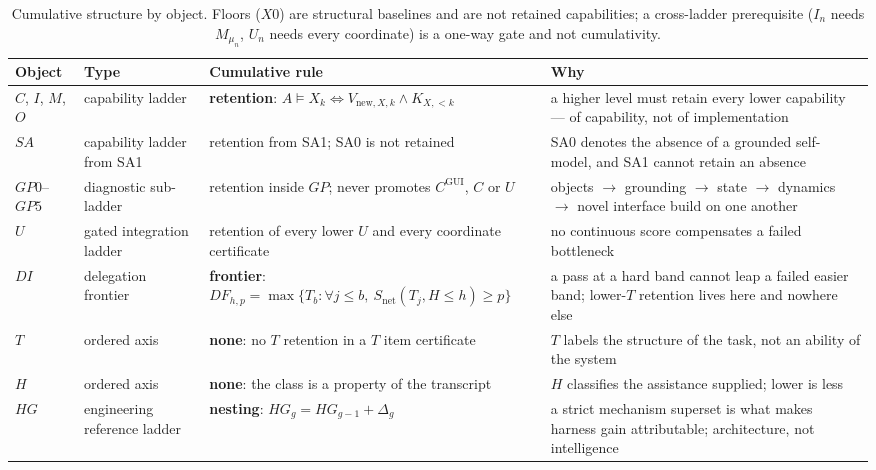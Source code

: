 \begin{table}[!htbp]
\centering\small
\begin{tabularx}{\textwidth}{@{}llYY@{}}
\toprule
Object & Type & Cumulative rule & Why \\
\midrule
$C$, $I$, $M$, $O$ & capability ladder & \textbf{retention}: $A \models X_k \iff V_{\mathrm{new},X,k} \wedge K_{X,<k}$ & a higher level must retain every lower capability --- of capability, not of implementation \\
$SA$ & capability ladder from SA1 & retention from SA1; SA0 is not retained & SA0 denotes the absence of a grounded self-model, and SA1 cannot retain an absence \\
$GP0$--$GP5$ & diagnostic sub-ladder & retention inside $GP$; never promotes $C^{\mathrm{GUI}}$, $C$ or $U$ & objects $\to$ grounding $\to$ state $\to$ dynamics $\to$ novel interface build on one another \\
$U$ & gated integration ladder & retention of every lower $U$ and every coordinate certificate & no continuous score compensates a failed bottleneck \\
$DI$ & delegation frontier & \textbf{frontier}: $DF_{h,p} = \max\{T_b : \forall j \le b,\ S_{\mathrm{net}}(T_j, H \le h) \ge p\}$ & a pass at a hard band cannot leap a failed easier band; lower-$T$ retention lives here and nowhere else \\
$T$ & ordered axis & \textbf{none}: no $T$ retention in a $T$ item certificate & $T$ labels the structure of the task, not an ability of the system \\
$H$ & ordered axis & \textbf{none}: the class is a property of the transcript & $H$ classifies the assistance supplied; lower is less \\
$HG$ & engineering reference ladder & \textbf{nesting}: $HG_g = HG_{g-1} + \Delta_g$ & a strict mechanism superset is what makes harness gain attributable; architecture, not intelligence \\
\bottomrule
\end{tabularx}
\caption{Cumulative structure by object. Floors ($X0$) are structural baselines and are not retained capabilities; a cross-ladder prerequisite ($I_n$ needs $M_{\mu_n}$, $U_n$ needs every coordinate) is a one-way gate and not cumulativity.}
\label{tab:typed}
\end{table}

